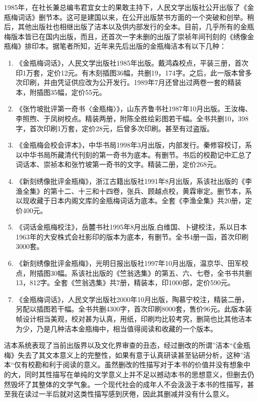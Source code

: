 1985年，在社长兼总编韦君宜女士的果敢主持下，人民文学出版社公开出版了《金瓶梅词话》删节本。这可是建国以来，在公开出版禁书方面的一个突破和创举。稍后，其他出版社也相继出版了洁本以及供内部发行的全本。目前，几乎所有的金瓶梅版本皆已在国内出版，而且，还首次一字未删的出版了崇祯年间刊刻的《绣像金瓶梅》排印本。据笔者所知，近年来先后出版的金瓶梅洁本有以下几种：
\begin{enumerate}
\item 《金瓶梅词话》，人民文学出版社1985年出版。戴鸿森校点，平装三册，首次印1万套，定价12元。有木刻插图36幅，共删19，174字。之后，此一版本曾多次印刷，并由凭证供应改为公开发行。1989年7月还曾出过两卷一套的精装本，附插图35幅，定价55元。
\item 《张竹坡批评第一奇书〈金瓶梅〉》，山东齐鲁书社1987年10月出版。王汝梅、李照煦、于凤树校点。精装两册，附陈全胜绘彩图若干幅。全书共删10，398字，首次印刷1万套，定价28元，后曾多次印刷。甚至有过盗版。
\item 《金瓶梅会校会评本》，中华书局1998年3月出版，内部发行。秦修容校订，系以中华书局所藏清代刊刻的第一奇书为底本。有删节。书后的校勘记中汇总了词话本、崇祯本和张竹坡第一奇书的文字。精装二册，定价268元。
\item 《新刻绣像批评金瓶梅》，浙江古籍出版社1991年8月出版，系该社出版的《李渔全集》的第十二、十三和十四卷，张兵、顾越点校，黄霖审定。删节本，系以现收藏于日本内阁文库的金瓶梅词话为底本。全套《李渔全集》共20册，定价400元。
\item 《词话金瓶梅校注》，岳麓书社1995年8月出版,白维国、卜键校注，系以日本1963年的大安株式会社影印的版本为底本，有删节。全书4册一函，首次印刷3000套。
\item 《新刻绣像批评金瓶梅》，光明日报出版社1997年10月出版，温京华、田军校点，附插图30幅。系该社出版的《竺翁选集》的第五、六、七卷，全书书共删13，812字。全套《竺翁选集》共7册，精装本，印1000部，定价590元。
\item 《金瓶梅词话》，人民文学出版社2000年10月出版，陶慕宁校注，精装二册，另配以插图若干幅。全书共删4300字，首次印刷8000套，售价96元。此版本装帧设计相当美观，校对甚为认真，用纸，印刷均比较考究，删简也比其他洁本为少，乃是几种洁本金瓶梅中，相当值得阅读和收藏的一个版本。
\end{enumerate}

洁本系统表现了当前出版界以及文化界审查的丑态，经过删改的所谓”洁本“《金瓶梅》失去了其文本意义上的完整性，如果有意于认真研读甚至钻研分析，这种”洁本“仅有校勘和利于阅读的意义。虽然删改的性描写对于本书的价值并没有想象中的大，同时其性描写在单纯的文学意义上并不足以撼动本书的思想意义，但删去仍然毁坏了其整体的文学气象。一个现代社会的成年人不会汲汲于本书的性描写，甚至我在读过一半后就对这类性描写感到厌倦，因此其删减并没有什么意义。

